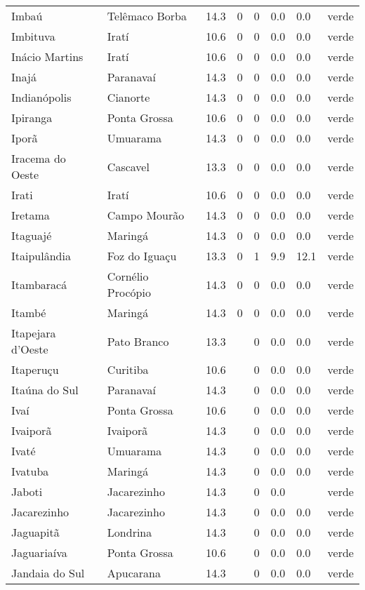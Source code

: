 \begin{longtable}{l|lllllll}
  Imbaú & Telêmaco Borba & 14.3 & 0 & 0 & 0.0 & 0.0 & verde \\ 
  Imbituva & Iratí & 10.6 & 0 & 0 & 0.0 & 0.0 & verde \\ 
  Inácio Martins & Iratí & 10.6 & 0 & 0 & 0.0 & 0.0 & verde \\ 
  Inajá & Paranavaí & 14.3 & 0 & 0 & 0.0 & 0.0 & verde \\ 
  Indianópolis & Cianorte & 14.3 & 0 & 0 & 0.0 & 0.0 & verde \\ 
  Ipiranga & Ponta Grossa & 10.6 & 0 & 0 & 0.0 & 0.0 & verde \\ 
  Iporã & Umuarama & 14.3 & 0 & 0 & 0.0 & 0.0 & verde \\ 
  Iracema do Oeste & Cascavel & 13.3 & 0 & 0 & 0.0 & 0.0 & verde \\ 
  Irati & Iratí & 10.6 & 0 & 0 & 0.0 & 0.0 & verde \\ 
  Iretama & Campo Mourão & 14.3 & 0 & 0 & 0.0 & 0.0 & verde \\ 
  Itaguajé & Maringá & 14.3 & 0 & 0 & 0.0 & 0.0 & verde \\ 
  Itaipulândia & Foz do Iguaçu & 13.3 & 0 & 1 & 9.9 & 12.1 & verde \\ 
  Itambaracá & Cornélio Procópio & 14.3 & 0 & 0 & 0.0 & 0.0 & verde \\ 
  Itambé & Maringá & 14.3 & 0 & 0 & 0.0 & 0.0 & verde \\ 
  Itapejara d'Oeste & Pato Branco & 13.3 &  & 0 & 0.0 & 0.0 & verde \\ 
  Itaperuçu & Curitiba & 10.6 &  & 0 & 0.0 & 0.0 & verde \\ 
  Itaúna do Sul & Paranavaí & 14.3 &  & 0 & 0.0 & 0.0 & verde \\ 
  Ivaí & Ponta Grossa & 10.6 &  & 0 & 0.0 & 0.0 & verde \\ 
  Ivaiporã & Ivaiporã & 14.3 &  & 0 & 0.0 & 0.0 & verde \\ 
  Ivaté & Umuarama & 14.3 &  & 0 & 0.0 & 0.0 & verde \\ 
  Ivatuba & Maringá & 14.3 &  & 0 & 0.0 & 0.0 & verde \\ 
  Jaboti & Jacarezinho & 14.3 &  & 0 & 0.0 &  & verde \\ 
  Jacarezinho & Jacarezinho & 14.3 &  & 0 & 0.0 & 0.0 & verde \\ 
  Jaguapitã & Londrina & 14.3 &  & 0 & 0.0 & 0.0 & verde \\ 
  Jaguariaíva & Ponta Grossa & 10.6 &  & 0 & 0.0 & 0.0 & verde \\ 
  Jandaia do Sul & Apucarana & 14.3 &  & 0 & 0.0 & 0.0 & verde \\ 

\end{longtable}
